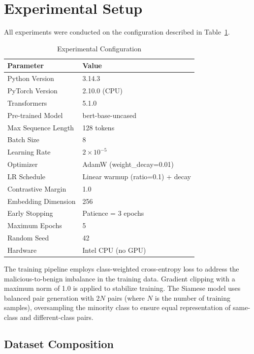 \documentclass[11pt]{article}
\begin{document}
\section{Experimental Setup}
\label{sec:setup}

All experiments were conducted on the configuration described in Table~\ref{tab:config}.

\begin{table}[h]
\centering
\caption{Experimental Configuration}
\label{tab:config}
\begin{tabular}{@{}ll@{}}
\toprule
\textbf{Parameter} & \textbf{Value} \\
\midrule
Python Version        & 3.14.3 \\
PyTorch Version       & 2.10.0 (CPU) \\
Transformers          & 5.1.0 \\
Pre-trained Model     & bert-base-uncased \\
Max Sequence Length    & 128 tokens \\
Batch Size            & 8 \\
Learning Rate         & $2 \times 10^{-5}$ \\
Optimizer             & AdamW (weight\_decay=0.01) \\
LR Schedule           & Linear warmup (ratio=0.1) + decay \\
Contrastive Margin    & 1.0 \\
Embedding Dimension   & 256 \\
Early Stopping        & Patience = 3 epochs \\
Maximum Epochs        & 5 \\
Random Seed           & 42 \\
Hardware              & Intel CPU (no GPU) \\
\bottomrule
\end{tabular}
\end{table}

The training pipeline employs class-weighted cross-entropy loss to address the malicious-to-benign imbalance in the training data. Gradient clipping with a maximum norm of 1.0 is applied to stabilize training. The Siamese model uses balanced pair generation with $2N$ pairs (where $N$ is the number of training samples), oversampling the minority class to ensure equal representation of same-class and different-class pairs.

\subsection{Dataset Composition}
\end{document}
